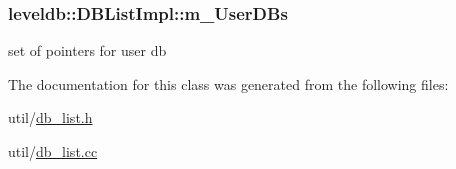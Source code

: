 \hypertarget{classleveldb_1_1_d_b_list_impl_a22538888b46611bcca4079e73b703027}{}
\subsubsection[{m\+\_\+\+User\+D\+Bs}]{ leveldb\+::\+D\+B\+List\+Impl\+::m\+\_\+\+User\+D\+Bs\hspace{0.3cm}{\ttfamily [protected]}}\label{classleveldb_1_1_d_b_list_impl_a22538888b46611bcca4079e73b703027}


set of pointers for user db 



The documentation for this class was generated from the following files\+:\begin{DoxyCompactItemize}
\item 
util/\hyperlink{db__list_8h}{db\+\_\+list.\+h}\item 
util/\hyperlink{db__list_8cc}{db\+\_\+list.\+cc}\end{DoxyCompactItemize}
